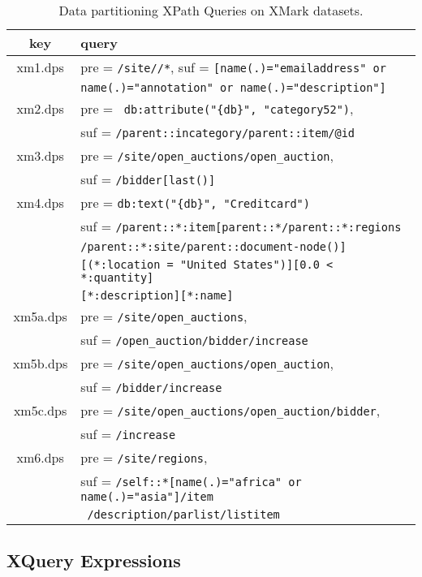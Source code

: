  \begin{table}[t]
 	\caption{Data partitioning XPath Queries on XMark datasets. }
 	\label{table:dpsqueries}
 	\footnotesize
 	\centering
 	\begin{tabular}{c|l}
 		\hline\hline
 		key      &  query\\ 
 		\hline\hline
 		xm1.dps & pre = \verb|/site//*|, suf = \verb|[name(.)="emailaddress" or| \\
 		        & \verb|name(.)="annotation" or name(.)="description"]| \\
 		\hline
 		xm2.dps & pre = \verb| db:attribute("{db}", "category52")|, \\
        		& suf = \verb|/parent::incategory/parent::item/@id| \\
  		\hline
 		xm3.dps & pre = \verb|/site/open_auctions/open_auction|,\\
 		&  suf = \verb|/bidder[last()]| \\ 
 		\hline
 		xm4.dps & pre = \verb|db:text("{db}", "Creditcard")| \\
 		& suf =  \verb|/parent::*:item[parent::*/parent::*:regions| \\
 		& \verb|/parent::*:site/parent::document-node()]| \\
 		& \verb|[(*:location = "United States")][0.0 < *:quantity]| \\
 		& \verb|[*:description][*:name]|\\
 		\hline
 		xm5a.dps & pre  = \verb|/site/open_auctions|,\\
 		& suf =  \verb|/open_auction/bidder/increase|\\
 		xm5b.dps & pre  = \verb|/site/open_auctions/open_auction|,\\
 		& suf =  \verb|/bidder/increase|\\
  		xm5c.dps & pre  = \verb|/site/open_auctions/open_auction/bidder|,\\
        & suf =  \verb|/increase|\\
 		\hline
 		xm6.dps & pre  = \verb|/site/regions|,\\
        & suf =  \verb|/self::*[name(.)="africa" or name(.)="asia"]/item|\\
        & \verb| /description/parlist/listitem|\\
 		\hline\hline   
 	\end{tabular}
 \end{table}
 

 
\subsection{XQuery Expressions}
\label{app:xqueries}

